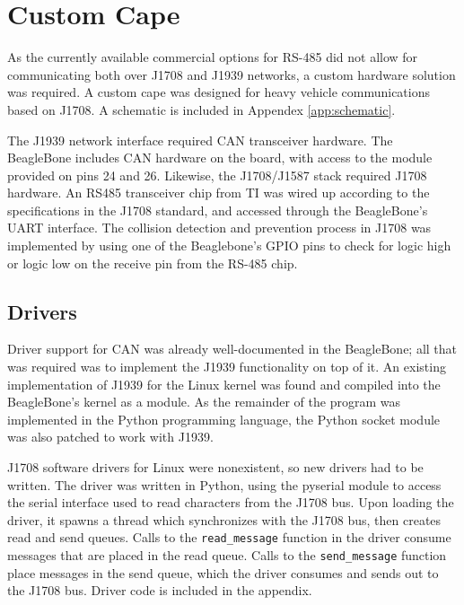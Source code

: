 \section{Custom Cape}

As the currently available commercial options for RS-485 did not allow for communicating both over J1708 and J1939 networks, a custom
hardware solution was required. A custom cape was designed for heavy vehicle communications based on J1708\cite{J1708}. A schematic is included in 
Appendex \ref{app:schematic}.

The J1939 network interface required CAN transceiver hardware. The BeagleBone includes CAN hardware on the board, with access
to the module provided on pins 24 and 26. Likewise, the J1708/J1587 stack required J1708 hardware. An RS485 transceiver chip from TI
was wired up according to the specifications in the J1708 standard, and accessed through the BeagleBone's UART interface.
The collision detection and prevention process in J1708 was implemented by using one of the Beaglebone's GPIO pins
to check for logic high or logic low on the receive pin from the RS-485 chip.

\subsection{Drivers}

Driver support for CAN was already well-documented in the BeagleBone; all that was required was to implement the J1939
functionality on top of it. An existing implementation of J1939 for the Linux kernel was found \cite{j1939linux} and compiled into
the BeagleBone's kernel as a module. As the remainder of the program was implemented in the Python programming language,
the Python socket module was also patched to work with J1939.

J1708 software drivers for Linux were nonexistent, so new drivers had to be written. The driver was written in Python, using the pyserial
module to access the serial interface used to read characters from the J1708 bus. Upon loading the driver, it spawns a thread which synchronizes
with the J1708 bus, then creates read and send queues. Calls to the \texttt{read\_message} function in the driver consume messages that are placed in the
read queue. Calls to the \texttt{send\_message} function place messages in the send queue, which the driver consumes and sends out to the J1708 bus.
Driver code is included in the appendix.


